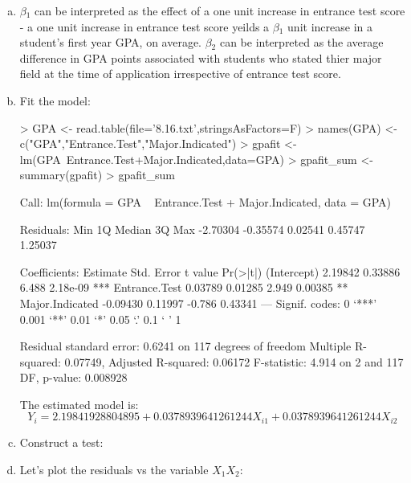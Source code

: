 \documentclass{article}
\begin{document}
\begin{enumerate}[a)]
\item{} $\beta{}_1$ can be interpreted as the effect of a one unit increase in entrance test score - a one unit increase in entrance test score yeilds a $\beta{}_1$ unit increase in a student's first year GPA, on average. $\beta{}_2$ can be interpreted as the average difference in GPA points associated with students who stated thier major field at the time of application irrespective of entrance test score.
\item{} Fit the model:

\begin{Schunk}
\begin{Sinput}
> GPA <- read.table(file='8.16.txt',stringsAsFactors=F)
> names(GPA) <- c("GPA","Entrance.Test","Major.Indicated")
> gpafit <- lm(GPA~Entrance.Test+Major.Indicated,data=GPA)
> gpafit_sum <- summary(gpafit)
> gpafit_sum
\end{Sinput}
\begin{Soutput}
Call:
lm(formula = GPA ~ Entrance.Test + Major.Indicated, data = GPA)

Residuals:
     Min       1Q   Median       3Q      Max 
-2.70304 -0.35574  0.02541  0.45747  1.25037 

Coefficients:
                Estimate Std. Error t value Pr(>|t|)    
(Intercept)      2.19842    0.33886   6.488 2.18e-09 ***
Entrance.Test    0.03789    0.01285   2.949  0.00385 ** 
Major.Indicated -0.09430    0.11997  -0.786  0.43341    
---
Signif. codes:  0 ‘***’ 0.001 ‘**’ 0.01 ‘*’ 0.05 ‘.’ 0.1 ‘ ’ 1

Residual standard error: 0.6241 on 117 degrees of freedom
Multiple R-squared:  0.07749,	Adjusted R-squared:  0.06172 
F-statistic: 4.914 on 2 and 117 DF,  p-value: 0.008928
\end{Soutput}
\end{Schunk}

The estimated model is:
$$ Y_i = 2.19841928804895 + 0.0378939641261244X_{i1} + 0.0378939641261244X_{i2} $$
\item{} Construct a test:



\item{} Let's plot the residuals vs the variable $X_1X_2$:


\end{enumerate}
\end{document}

